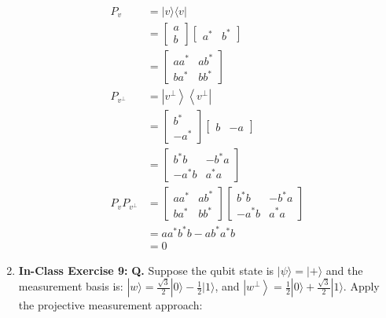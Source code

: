 \documentclass[main.tex]{subfiles}
\begin{document}
\begin{enumerate}
    \begin{align*}
        P_{v}               & = |v\rangle\langle v| \\
                            & = \left[\begin{array}{l} a \\ b \end{array}\right] \left[\begin{array}{ll} a^{*} & b^{*} \end{array}\right]\\
                            & = \left[\begin{array}{ll} a a^{*} & a b^{*} \\ b a^{*} & b b^{*} \end{array}\right]\\
        P_{v^{\perp}}       & = \left|v^{\perp}\right\rangle \left\langle v^{\perp}\right|\\
                            & = \left[\begin{array}{l} b^{*} \\ -a^{*} \end{array}\right] \left[\begin{array}{ll} b & -a \end{array}\right]\\
                            & = \left[\begin{array}{ll} b^{*} b & -b^{*} a  \\ -a^{*} b & a^{*} a \end{array}\right]\\
        P_{v}P_{v^{\perp}}  & = \left[\begin{array}{ll} a a^{*} & a b^{*} \\ b a^{*} & b b^{*} \end{array}\right]
                            \left[\begin{array}{ll} b^{*} b & -b^{*} a \\ -a^{*} b & a^{*} a \end{array}\right]\\
                            & = a a^{*} b^{*} b - a b^{*} a^{*} b \\
                            & = 0
    \end{align*}

\item[] \textbf{In-Class Exercise 9:} \textbf{Q.} Suppose the qubit state is $|\psi\rangle=|+\rangle$ and the measurement basis is: $|w\rangle=\frac{\sqrt{3}}{2}|0\rangle-\frac{1}{2}|1\rangle$, and $\left|w^{\perp}\right\rangle=\frac{1}{2}|0\rangle+\frac{\sqrt{3}}{2}|1\rangle$. Apply the projective measurement approach: 


\end{enumerate}
\end{document}
